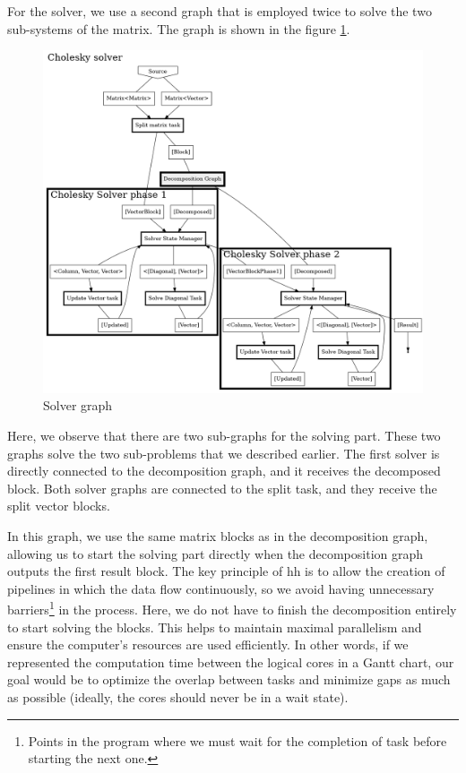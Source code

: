 For the solver, we use a second graph that is employed twice to solve the two
sub-systems of the matrix. The graph is shown in the figure
\ref{fig:solvergraph}.

\begin{figure}[!ht]
  \begin{center}
    \includegraphics[scale=0.3]{img/cho-img/solver_graph.png}
    \caption{Solver graph}
    \label{fig:solvergraph}
  \end{center}
\end{figure}

Here, we observe that there are two sub-graphs for the solving part. These two
graphs solve the two sub-problems that we described earlier. The first solver is
directly connected to the decomposition graph, and it receives the decomposed
block. Both solver graphs are connected to the split task, and they receive the
split vector blocks.

In this graph, we use the same matrix blocks as in the decomposition graph,
allowing us to start the solving part directly when the decomposition graph
outputs the first result block. The key principle of \gls{hh} is to allow the
creation of pipelines in which the data flow continuously, so we avoid having
unnecessary barriers\footnote{Points in the program where we must wait for the
completion of task before starting the next one.} in the process. Here, we do
not have to finish the decomposition entirely to start solving the blocks. This
helps to maintain maximal parallelism and ensure the computer's resources are
used efficiently. In other words, if we represented the computation time between
the logical cores in a Gantt chart, our goal would be to optimize the overlap
between tasks and minimize gaps as much as possible (ideally, the cores should
never be in a wait state).

